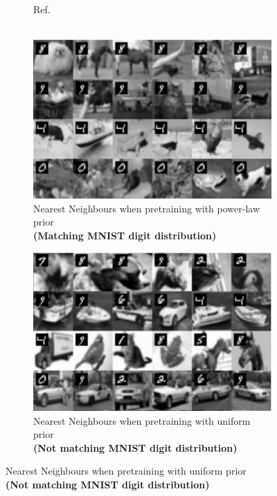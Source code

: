 \documentclass{article} %
\begin{document}
\begin{figure}[t]
\begin{subfigure}{0.0771\textwidth}
        \caption{Ref.\\\ }
    \end{subfigure}\hfill
    \begin{subfigure}{0.45\textwidth}
        \centering
        \includegraphics[width=\textwidth]{assets/cifar10-powerlaw.pdf}
        \caption{Nearest Neighbours when pretraining with power-law prior\\
        {\bf (Matching MNIST digit distribution)}}
        \label{fig:cifar10-nn-powerlaw}
    \end{subfigure}\hfill
    \begin{subfigure}{0.45\textwidth}
        \centering
        \includegraphics[width=\textwidth]{assets/cifar10-uniform.pdf}
        \caption{Nearest Neighbours when pretraining with uniform prior\\
        {\bf(Not matching MNIST digit distribution)}}
        \label{fig:cifar10-nn-uniform}

\end{subfigure}
\end{figure}
\end{document}
